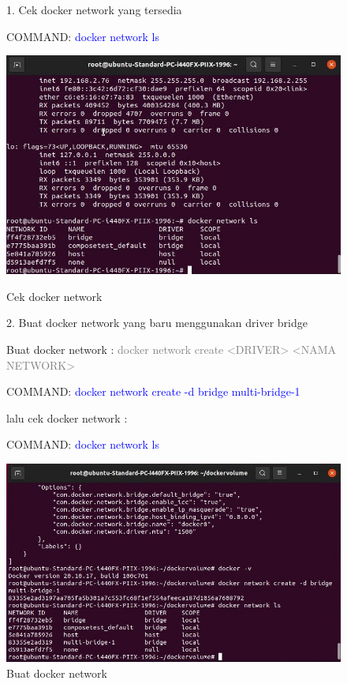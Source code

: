 \begin{figure}
    1. Cek docker network yang tersedia 

    COMMAND: \textcolor{Blue}{docker network ls}
        \begin{center}
            \includegraphics[width=\linewidth]{image/50.jpg}
            \caption{Cek docker network}
            \label{fig:my_figure}
        \end{center}

    2. Buat docker network yang baru menggunakan driver bridge 

    Buat docker network : \textcolor{Gray}{docker network create <DRIVER> <NAMA NETWORK>}

    COMMAND: \textcolor{Blue}{docker network create -d bridge multi-bridge-1}

    lalu cek docker network :

    COMMAND: \textcolor{Blue}{docker network ls}
        \begin{center}
            \includegraphics[width=\linewidth]{image/54.jpg}
            \caption{Buat docker network}
            \label{fig:my_figure}
        \end{center}
\end{figure}

